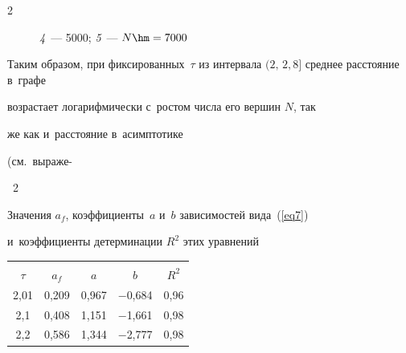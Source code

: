 \begin{multicols}{2}
\begin{figure}[b]
\begin{minipage}[t]{79.94mm}
{\textit{4}~--- 5000; \textit{5}~--- $N\hm=7000$}

\end{minipage}

\end{figure}



Таким образом, при фиксированных~$\tau$ из интервала $(2,\,2{,}8]$ сред\-нее рас\-сто\-яние в~графе

возрастает логарифмически с~рос\-том чис\-ла его вершин $N$, так

же как и~рас\-сто\-яние в~асимп\-то\-ти\-ке

(см.\ выраже-\linebreak\vspace*{-12pt}




\begin{center}



\vspace*{6pt}



\noindent

\parbox{62mm}{{{\tablename~2}\ \ \small{Значения $a_f$, коэффициенты~$a$ и~$b$ зависимостей вида~(\ref{eq7})

и~коэффициенты детерминации $R^2$ этих уравнений

}}

}



\vspace*{6pt}





{\small \begin{tabular}{|c|c|c|c|c|}

\hline

&&&&\\[-10pt]

$\tau$ & $a_f$ & $a$ & $b$ & $R^2$ \\

 \hline

\hphantom{9}2,01 & 0,209 & 0,967 & $-$0,684 & 0,96 \\

2,1 &   0,408 & 1,151 & $-$1,661 & 0,98 \\

2,2 &   0,586 & 1,344 & $-$2,777 & 0,98 \\


\end{tabular}}
\end{center}
\end{multicols}
